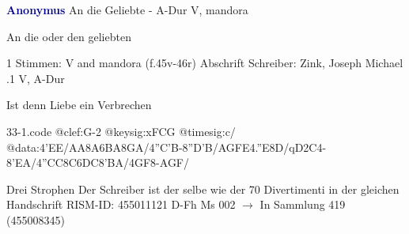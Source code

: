 \documentclass[twocolumn]{book}
\begin{document}
\newline \par \vspace{7pt} \textcolor{darkblue}{\textbf{Anonymus  }}
\newline An die Geliebte - A-Dur
\newline V, mandora
\newline \begin{itshape}[heading, f.45v:] An die oder den geliebten\end{itshape} 
\newline \textcolor{darkblue}{}  1 Stimmen: V and mandora  (f.45v-46r)
\newline Abschrift
\newline Schreiber: Zink, Joseph Michael
.1  V, A-Dur
\newline \begin{footnotesize} Ist denn Liebe ein Verbrechen \end{footnotesize}  
\begin{filecontents*}{33-1.code}
@clef:G-2
@keysig:xFCG
@timesig:c/
@data:4'EE/AA{8A6BA}8GA/4''C'B-8''D'B/{AG}{FE}4.''E8D/qD2C4-8'EA/4''CC{8C6DC}8'BA/4GF8-AGF/
\end{filecontents*}
\newline
%
\newline Drei Strophen
\newline Der Schreiber ist der selbe wie der 70 Divertimenti in der gleichen Handschrift
\newline RISM-ID: 455011121
\newline D-Fh  Ms 002
\newline $\rightarrow$ In Sammlung 419 (455008345)
      
\end{document}
